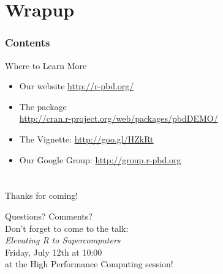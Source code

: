 \section{Wrapup}

\hidenum
\begin{frame}[noframenumbering]
\frametitle{Contents}
 \tableofcontents[currentsection,hideothersubsections,sectionstyle=show/hide]
\end{frame}
\shownum

\begin{frame}
  \begin{block}{Where to Learn More}
    \begin{itemize}
      \item Our website \url{http://r-pbd.org/}
      \item The  package\\
      \url{http://cran.r-project.org/web/packages/pbdDEMO/}\\
      \item The  Vignette: \url{http://goo.gl/HZkRt}
      \item Our Google Group: \url{http://group.r-pbd.org}
    \end{itemize}
\end{block}
\end{frame}


\section*{}


%   
%   


\hidenum
\begin{frame}[noframenumbering]
 \begin{block}{Thanks for coming!}
 \begin{center}
     {\Large Questions?  Comments?}\\[.6cm]
    Don't forget to come to the talk:\\[.2cm]
    \emph{Elevating R to Supercomputers}\\
    Friday, July 12th at 10:00\\
    at the High Performance Computing session!
  \end{center}
 \end{block}
\end{frame}
